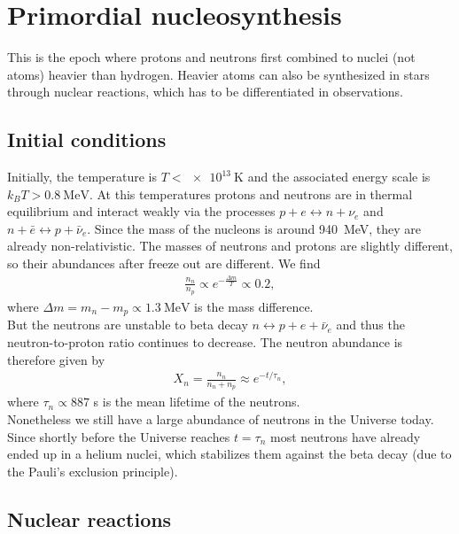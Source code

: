 \section{Primordial nucleosynthesis}

This is the epoch where protons and neutrons first combined to nuclei (not atoms) heavier than hydrogen. Heavier atoms can also be synthesized in stars through nuclear reactions, which has to be differentiated in observations.

\subsection*{Initial conditions}

Initially, the temperature is $T < \SI{e13}{\kelvin}$ and the associated energy scale is $k_B T > \SI{0.8}{\MeV}$. At this temperatures protons and neutrons are in thermal equilibrium and interact weakly via the processes $p + e \leftrightarrow n + \nu_e$ and $n + \bar{e} \leftrightarrow p + \bar{\nu}_e$. Since the mass of the nucleons is around \SI{940}{\MeV}, they are already non-relativistic. The masses of neutrons and protons are slightly different, so their abundances after freeze out are different. We find
\begin{align*}
	\frac{n_n}{n_p} \propto e^{-\frac{\Delta m}{T}} \propto 0.2,
\end{align*}
where $\Delta m = m_n - m_p \propto \SI{1.3}{\MeV}$ is the mass difference.\\
But the neutrons are unstable to beta decay $n \leftrightarrow p + e + \bar{\nu}_e$ and thus the neutron-to-proton ratio continues to decrease. The neutron abundance is therefore given by
\begin{align*}
	X_n = \frac{n_n}{n_n + n_p} \approx e^{-t/\tau_n},
\end{align*}
where $\tau_n \propto 887$ s is the mean lifetime of the neutrons.\\
Nonetheless we still have a large abundance of neutrons in the Universe today. Since shortly before the Universe reaches $t = \tau_n$ most neutrons have already ended up in a helium nuclei, which stabilizes them against the beta decay (due to the Pauli's exclusion principle).  

\subsection*{Nuclear reactions}

